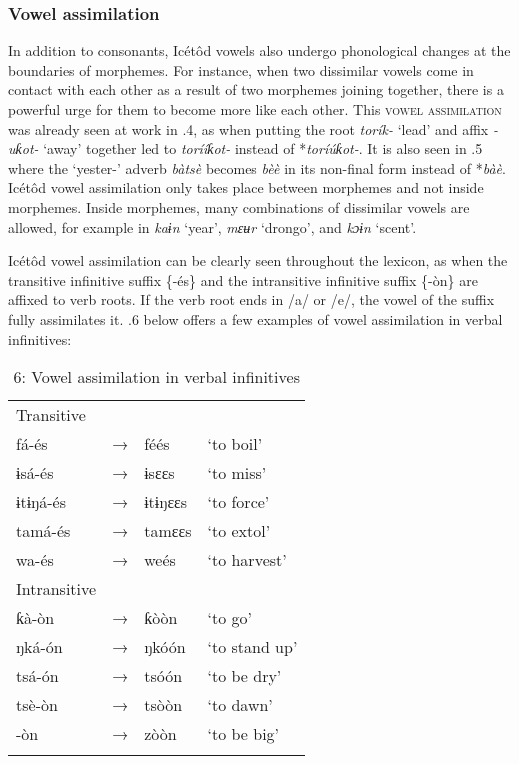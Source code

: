 \subsubsection{Vowel assimilation}

In addition to consonants, Icétôd vowels also undergo phonological changes at the boundaries of morphemes. For instance, when two dissimilar vowels come in contact with each other as a result of two morphemes joining together, there is a powerful urge for them to become more like each other. This \textsc{vowel assimilation} was already seen at work in .4, as when putting the root \textit{torík- }‘lead’ and affix \textit{{}-uƙot- }‘away’ together led to \textit{tor}\textit{íí}\textit{ƙot- }instead of *\textit{tor}\textit{íú}\textit{ƙot-}. It is also seen in .5 where the ‘yester-’ adverb \textit{bàtsè }becomes \textit{b}\textit{èè}\textit{ }in its non-final form instead of *\textit{b}\textit{àè}. Icétôd vowel assimilation only takes place between morphemes and not inside morphemes. Inside morphemes, many combinations of dissimilar vowels are allowed, for example in \textit{kaɨn }‘year’, \textit{mɛʉr }‘drongo’, and \textit{kɔɨn }‘scent’. 

Icétôd vowel assimilation can be clearly seen throughout the lexicon, as when the transitive infinitive suffix \{-és\} and the intransitive infinitive suffix \{-òn\} are affixed to verb roots. If the verb root ends in /a/ or /e/, the vowel of the suffix fully assimilates it. .6 below offers a few examples of vowel assimilation in verbal infinitives:


\begin{table}
\caption{6: Vowel assimilation in verbal infinitives}
\label{tab:2}


\begin{tabularx}{\textwidth}{XXXX}
\lsptoprule

Transitive &  &  & \\
fá-és & → & féés & ‘to boil’\\
ɨsá-és & → & ɨsɛɛs & ‘to miss’\\
ɨtɨŋá-és & → & ɨtɨŋɛɛs & ‘to force’\\
tamá-és & → & tamɛɛs & ‘to extol’\\
wa-és & → & weés & ‘to harvest’\\
Intransitive &  &  & \\
ƙà-òn & → & ƙòòn & ‘to go’\\
ŋká-ón & → & ŋkóón & ‘to stand up’\\
tsá-ón & → & tsóón & ‘to be dry’\\
tsè-òn & → & tsòòn & ‘to dawn’\\-òn & → & zòòn & ‘to be big’\\
\lspbottomrule
\end{tabularx}
\end{table}

